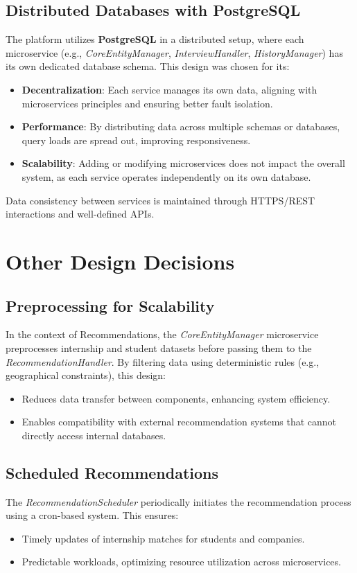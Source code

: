 \subsection{Distributed Databases with PostgreSQL}
The platform utilizes \textbf{PostgreSQL} in a distributed setup, where each microservice (e.g., \textit{CoreEntityManager}, \textit{InterviewHandler}, \textit{HistoryManager}) has its own dedicated database schema. This design was chosen for its:
\begin{itemize}
    \item \textbf{Decentralization}: Each service manages its own data, aligning with microservices principles and ensuring better fault isolation.
    \item \textbf{Performance}: By distributing data across multiple schemas or databases, query loads are spread out, improving responsiveness.
    \item \textbf{Scalability}: Adding or modifying microservices does not impact the overall system, as each service operates independently on its own database.
\end{itemize}
Data consistency between services is maintained through HTTPS/REST interactions and well-defined APIs.


\section{Other Design Decisions}

\subsection{Preprocessing for Scalability}
In the context of Recommendations, the \textit{CoreEntityManager} microservice preprocesses internship and student datasets before passing them to the \textit{RecommendationHandler}. By filtering data using deterministic rules (e.g., geographical constraints), this design:
\begin{itemize}
    \item Reduces data transfer between components, enhancing system efficiency.
    \item Enables compatibility with external recommendation systems that cannot directly access internal databases.
\end{itemize}

\subsection{Scheduled Recommendations}
The \textit{RecommendationScheduler} periodically initiates the recommendation process using a cron-based system. This ensures:
\begin{itemize}
    \item Timely updates of internship matches for students and companies.
    \item Predictable workloads, optimizing resource utilization across microservices.
\end{itemize}

